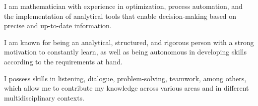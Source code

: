 







I am mathematician with experience in optimization, process automation, and the implementation of analytical tools that enable decision-making based on precise and up-to-date information.

I am known for being an analytical, structured, and rigorous person with a strong motivation to constantly learn, as well as being autonomous in developing skills according to the requirements at hand.

I possess skills in listening, dialogue, problem-solving, teamwork, among others, which allow me to contribute my knowledge across various areas and in different multidisciplinary contexts.